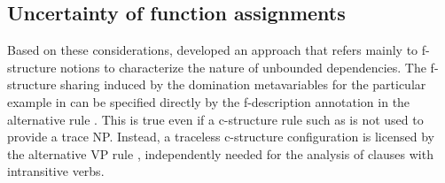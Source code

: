 \documentclass[output=paper,hidelinks]{langscibook}
\begin{document}
\subsection{Uncertainty of function assignments}

Based on these considerations, \citet{kaplzaen89} developed an approach that refers mainly to f-structure notions to characterize the nature of unbounded dependencies. The f-structure sharing induced by the domination metavariables for the particular example in  can be specified directly by the f-description annotation in the alternative rule . This is true even if a c-structure rule such as  is not used to provide a trace NP.  Instead, a traceless c-structure configuration is licensed by the alternative  VP rule , independently needed for the analysis of clauses with intransitive verbs.

\ea \label{rule3}
\ea\label{rule3S}
\ex\label{rule3VP}
\z\z
\end{document}
